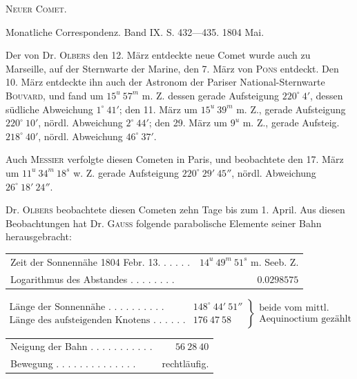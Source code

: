 \begin{flushright}
\end{flushright}

\bigskip
{}
\centerline{\textsc{Neuer Comet.}}

\medskip
Monatliche Correspondenz. Band IX. S. 432---435. 1804 Mai.

\medskip
Der von Dr. \textsc{Olbers} den 12. März entdeckte neue Comet wurde auch zu Marseille, auf der Sternwarte der Marine, den 7. März von \textsc{Pons} entdeckt. Den 10. März entdeckte ihn auch der Astronom der Pariser National-Sternwarte \textsc{Bouvard}, und fand um $15^u\ 57^m$ m. Z. dessen gerade Aufsteigung $220^\circ\ 4'$, dessen südliche Abweichung $1^\circ\ 41'$; den 11. März um $15^u\ 39^m$ m. Z., gerade Aufsteigung $220^\circ\ 10'$, nördl. Abweichung $2^\circ\ 44'$; den 29. März um $9^u$ m. Z., gerade Aufsteig. $218^\circ\ 40'$, nördl. Abweichung $46^\circ\ 37'$.

Auch \textsc{Messier} verfolgte diesen Cometen in Paris, und beobachtete den 17. März um $11^u\ 34^m\ 18^s$ w. Z. gerade Aufsteigung $220^\circ\ 29'\ 45''$, nördl. Abweichung $26^\circ\ 18'\ 24''$.

Dr. \textsc{Olbers} beobachtete diesen Cometen zehn Tage bis zum 1. April. Aus diesen Beobachtungen hat Dr. \textsc{Gauss} folgende parabolische Elemente seiner Bahn herausgebracht:

\begin{center}
\begingroup\fontsize{9}{11}\selectfont\setlength{\tabcolsep}{3pt}
\begin{tabular}{lr}
Zeit der Sonnennähe 1804 Febr. 13. . . . . . & $14^u\ 49^m\ 51^s$ m. Seeb. Z. \\
Logarithmus des Abstandes . . . . . . . . & $0.0298575$ \\
\end{tabular}\endgroup
\end{center}
{\fontsize{8}{10}\selectfont
\[\left.\begin{array}{ll}\text{Länge der Sonnennähe . . . . . . . . . .}&148^\circ\ 44'\ 51''\\\text{Länge des aufsteigenden Knotens . . . . . .}&176\ 47\ 58\end{array}\right\}\begin{array}{l}\text{beide vom mittl.}\\\text{Aequinoctium gezählt}\end{array}\]}
\begin{center}
\begingroup\fontsize{9}{11}\selectfont\setlength{\tabcolsep}{3pt}
\begin{tabular}{lr}
Neigung der Bahn . . . . . . . . . . . & $56\ 28\ 40$ \\
Bewegung . . . . . . . . . . . . . . & rechtläufig. \\
\end{tabular}\endgroup
\end{center}

